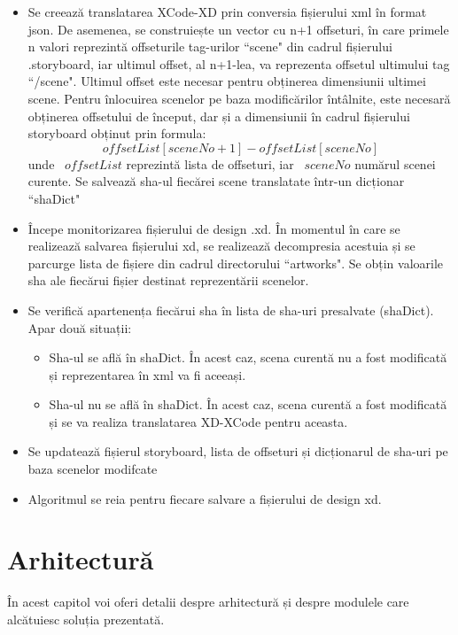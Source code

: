 \begin{itemize}  
\item Se creează translatarea XCode-XD prin conversia fișierului xml în format json. De asemenea, se construiește un vector cu n+1 offseturi, în care primele n valori reprezintă offseturile tag-urilor ``scene" din cadrul fișierului .storyboard, iar ultimul offset, al n+1-lea, va reprezenta offsetul ultimului tag ``/scene". Ultimul offset este necesar pentru obținerea dimensiunii ultimei scene. Pentru înlocuirea scenelor pe baza modificărilor întâlnite, este necesară obținerea offsetului de început, dar și a dimensiunii în cadrul fișierului storyboard obținut prin formula: 
\[offsetList[sceneNo + 1] - offsetList[sceneNo]\]
unde ~$offsetList$ reprezintă lista de offseturi, iar ~$sceneNo$ numărul scenei curente. Se salvează sha-ul fiecărei scene translatate într-un dicționar ``shaDict"

\item Începe monitorizarea fișierului de design .xd. În momentul în care se realizează salvarea fișierului xd, se realizează decompresia acestuia și se parcurge lista de fișiere din cadrul directorului ``artworks". Se obțin valoarile sha ale fiecărui fișier destinat reprezentării scenelor. 
\item Se verifică apartenența fiecărui sha în lista de sha-uri presalvate (shaDict). Apar două situații:
    \begin{itemize}  
    \item Sha-ul se află în shaDict. În acest caz, scena curentă nu a fost modificată și reprezentarea în xml va fi aceeași.
    \item Sha-ul nu se află în shaDict. În acest caz, scena curentă a fost modificată și se va realiza translatarea XD-XCode pentru aceasta.
    \end{itemize}
\item Se updatează fișierul storyboard, lista de offseturi și dicționarul de sha-uri pe baza scenelor modifcate
\item Algoritmul se reia pentru fiecare salvare a fișierului de design xd.
\end{itemize}


\section{Arhitectură}

În acest capitol voi oferi detalii despre arhitectură și despre modulele care alcătuiesc soluția prezentată.

